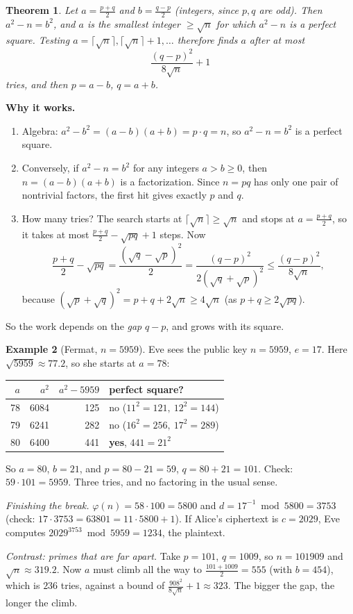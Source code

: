 \documentclass[11pt]{article}
\newtheorem{theorem}{Theorem}[section]
\theoremstyle{definition}
\newtheorem{example}[theorem]{Example}
\theoremstyle{remark}
\begin{document}
\begin{theorem}\label{thm:fermat}
Let $a=\tfrac{p+q}{2}$ and $b=\tfrac{q-p}{2}$ (integers, since $p,q$ are odd). Then $a^2-n=b^2$, and $a$ is the smallest integer $\ge\sqrt n$ for which $a^2-n$ is a perfect square. Testing $a=\lceil\sqrt n\rceil,\lceil\sqrt n\rceil+1,\dots$ therefore finds $a$ after at most
\[
\frac{(q-p)^2}{8\sqrt n}+1
\]
tries, and then $p=a-b$, $q=a+b$.
\end{theorem}

\textbf{Why it works.}
\begin{enumerate}[nosep]
\item Algebra: $a^2-b^2=(a-b)(a+b)=p\cdot q=n$, so $a^2-n=b^2$ is a perfect square.
\item Conversely, if $a^2-n=b^2$ for any integers $a>b\ge0$, then $n=(a-b)(a+b)$ is a factorization. Since $n=pq$ has only one pair of nontrivial factors, the first hit gives exactly $p$ and $q$.
\item How many tries? The search starts at $\lceil\sqrt n\rceil\ge\sqrt n$ and stops at $a=\tfrac{p+q}{2}$, so it takes at most $\tfrac{p+q}{2}-\sqrt{pq}+1$ steps. Now
\[
\frac{p+q}{2}-\sqrt{pq}=\frac{(\sqrt q-\sqrt p)^2}{2}=\frac{(q-p)^2}{2(\sqrt q+\sqrt p)^2}\le\frac{(q-p)^2}{8\sqrt n},
\]
because $(\sqrt p+\sqrt q)^2=p+q+2\sqrt n\ge4\sqrt n$ (as $p+q\ge2\sqrt{pq}$).
\end{enumerate}
So the work depends on the \emph{gap} $q-p$, and grows with its square.

\begin{example}[Fermat, $n=5959$]\label{ex:fermat}
Eve sees the public key $n=5959$, $e=17$. Here $\sqrt{5959}\approx77.2$, so she starts at $a=78$:
\begin{center}
\begin{tabular}{@{}rrrl@{}}
\toprule
$a$ & $a^2$ & $a^2-5959$ & perfect square? \\
\midrule
78 & 6084 & 125 & no ($11^2=121,\ 12^2=144$) \\
79 & 6241 & 282 & no ($16^2=256,\ 17^2=289$) \\
80 & 6400 & 441 & \textbf{yes}, $441=21^2$ \\
\bottomrule
\end{tabular}
\end{center}
So $a=80$, $b=21$, and $p=80-21=59$, $q=80+21=101$. Check: $59\cdot101=5959$. Three tries, and no factoring in the usual sense.

\emph{Finishing the break.} $\varphi(n)=58\cdot100=5800$ and $d=17^{-1}\bmod5800=3753$ (check: $17\cdot3753=63801=11\cdot5800+1$). If Alice's ciphertext is $c=2029$, Eve computes $2029^{3753}\bmod5959=1234$, the plaintext.

\emph{Contrast: primes that are far apart.} Take $p=101$, $q=1009$, so $n=101909$ and $\sqrt n\approx319.2$. Now $a$ must climb all the way to $\tfrac{101+1009}{2}=555$ (with $b=454$), which is $236$ tries, against a bound of $\tfrac{908^2}{8\sqrt n}+1\approx323$. The bigger the gap, the longer the climb.
\end{example}
\end{document}
